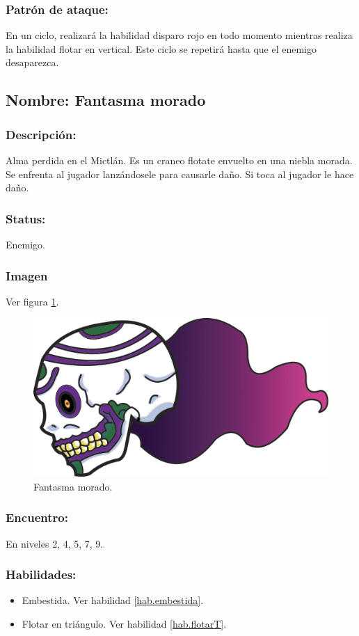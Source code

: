 \documentclass[11pt,letterpaper]{article}
\begin{document}
\subsubsection{Patrón de ataque:}
En un ciclo, realizará la habilidad disparo rojo en todo momento mientras realiza la habilidad flotar en vertical. Este ciclo se repetirá hasta que el enemigo desaparezca.

\subsection{Nombre: Fantasma morado}   \label{per.fantasmaM}
\subsubsection{Descripción:}
Alma perdida en el Mictlán. Es un craneo flotate envuelto en una niebla morada.
Se enfrenta al jugador lanzándosele para causarle daño. Si toca al jugador le hace daño. 
\subsubsection{Status:}
Enemigo.
\subsubsection{Imagen}
Ver figura \ref{fig:fantasmaM}.
\begin{figure}
	\centering
	\includegraphics[height=0.2 \textheight]{Imagenes/fantasmaMorado}
	\caption{Fantasma morado.}
	\label{fig:fantasmaM}
\end{figure}
\subsubsection{Encuentro:}
En niveles 2, 4, 5, 7, 9.
\subsubsection{Habilidades:}
\begin{itemize}
	\item Embestida. Ver habilidad \ref{hab.embestida}.
	\item Flotar en triángulo. Ver habilidad \ref{hab.flotarT}.
\end{itemize}
\end{document}
